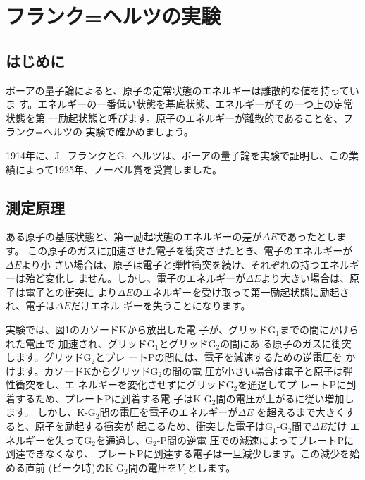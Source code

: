 %
%


\section{フランク=ヘルツの実験}

\subsection{はじめに}

ボーアの量子論によると、原子の定常状態のエネルギーは離散的な値を持っていま 
す。エネルギーの一番低い状態を基底状態、エネルギーがその一つ上の定常状態を第 
一励起状態と呼びます。原子のエネルギーが離散的であることを、フランク=ヘルツの 
実験で確かめましょう。

1914年に、J.~フランクとG.~ヘルツは、ボーアの量子論を実験で証明し、この業
績によって1925年、ノーベル賞を受賞しました。

\subsection{測定原理}

ある原子の基底状態と、第一励起状態のエネルギーの差が$\Delta E$であったとします。
この原子のガスに加速させた電子を衝突させたとき、電子のエネルギーが$\Delta E$より小
さい場合は、原子は電子と弾性衝突を続け、それぞれの持つエネルギーは殆ど変化し
ません。しかし、電子のエネルギーが$\Delta E$より大きい場合は、原子は電子との衝突に
より$\Delta E$のエネルギーを受け取って第一励起状態に励起され、電子は$\Delta E$だけエネル
ギーを失うことになります。


実験では、図1のカソードKから放出した電 
子が、グリッド$\text{G}_1$までの間にかけられた電圧で 
加速され、グリッド$\text{G}_1$とグリッド$\text{G}_2$の間にあ 
る原子のガスに衝突します。グリッド$\text{G}_2$とプレ 
ートPの間には、電子を減速するための逆電圧を 
かけます。カソードKからグリッド$\text{G}_2$の間の電 
圧が小さい場合は電子と原子は弾性衝突をし、エ 
ネルギーを変化させずにグリッド$\text{G}_2$を通過してプ 
レートPに到着するため、プレートPに到着する電 
子はK-$\text{G}_2$間の電圧が上がるに従い増加します。 
しかし、K-$\text{G}_2$間の電圧を電子のエネルギーが$\Delta E$ 
を超えるまで大きくすると、原子を励起する衝突が 
起こるため、衝突した電子は$\text{G}_1$-$\text{G}_2$間で$\Delta E$だけ 
エネルギーを失って$\text{G}_2$を通過し、$\text{G}_2$-P間の逆電 
圧での減速によってプレートPに到達できなくなり、 
プレートPに到達する電子は一旦減少します。この減少を始める直前 
(ピーク時)のK-$\text{G}_2$間の電圧を$V_1$とします。

